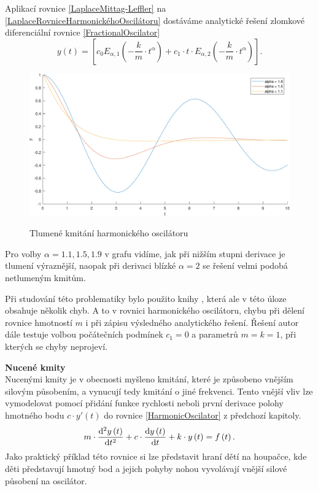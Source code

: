 \documentclass[a4paper,12pt,twoside]{article}
\theoremstyle{definition}
\theoremstyle{remark}
\numberwithin{equation}{section}
\numberwithin{table}{section}
\numberwithin{figure}{section}
\newcommand{\dx}[1]{\mathrm{d} #1}
\begin{document}
Aplikací  rovnice \eqref{LaplaceMittag-Leffler} na \eqref{LaplaceRovniceHarmonickéhoOscilátoru} dostáváme analytické řešení zlomkové diferenciální rovnice \eqref{FractionalOscilator}
\begin{equation}\label{LaplaceMittagLeffler}
	y\left(t\right) = \left[ c_{0} E_{\alpha, 1}\left(-\frac{k}{m}\cdot t^{\alpha}\right) + c_{1}\cdot t \cdot E_{\alpha, 2} \left(-\frac{k}{m}\cdot t ^{\alpha}\right)\right] .
\end{equation}
\begin{figure} [h!]
	\caption{Tlumené kmitání harmonického oscilátoru}
	\includegraphics[width=1\textwidth]{FractionalOscillator_AnalyticalSolution.pdf}
	\label{fig:HarmonicOscilatorAnalytical}
\end{figure}

Pro volby $\alpha = 1.1, 1.5, 1.9$ v grafu vidíme, jak při nižším stupni derivace je tlumení výraznější, naopak při derivaci blízké $\alpha = 2$ se řešení velmi podobá netlumeným kmitům.

Při studování této problematiky bylo použito knihy \cite{ChenInMechanics}, která ale v této úloze obsahuje několik chyb. A to v rovnici harmonického oscilátoru, chybu při dělení rovnice hmotností $m$ i při zápisu výsledného analytického řešení. Řešení autor dále testuje volbou počátečních podmínek $c_{1} = 0$ a parametrů $m = k = 1$, při kterých se chyby neprojeví. %




\textbf{Nucené kmity}\\
Nucenými kmity je v obecnosti myšleno kmitání, které je způsobeno vnějším silovým působením, a vynucují tedy kmitání o jiné frekvenci.
Tento vnější vliv lze vymodelovat pomocí přidání funkce rychlosti neboli první derivace polohy hmotného bodu $c\cdot y'\left(t\right)$ do rovnice \eqref{HarmonicOscilator} z předchozí kapitoly.
\begin{equation}
	m\cdot \frac{\dx ^{2} y\left(t\right)}{\dx t^{2}} + c\cdot \frac{\dx  y\left(t\right)}{\dx t} +k \cdot y\left(t\right) = f\left(t\right).
\end{equation}
Jako praktický příklad této rovnice si lze představit hraní dětí na houpačce, kde děti představují hmotný bod a jejich pohyby nohou vyvolávají vnější silové působení na oscilátor.
\end{document}

